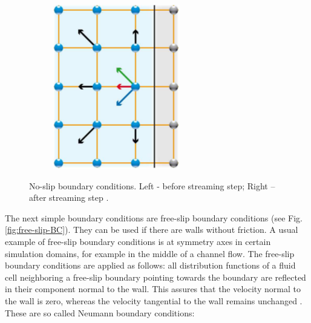 \begin{figure}[H]
\begin{subfigure}[h]{0.3\textwidth}
    \includegraphics[width=\textwidth]{img/fig8-2.png}
  \end{subfigure}
  \caption{No-slip boundary conditions. Left - before streaming step; Right – after streaming step \cite{pflaum}.}\label{fig:no-slip-BC}
\end{figure}

The next simple boundary conditions are free-slip boundary conditions (see Fig. \ref{fig:free-slip-BC}). They can be used if there are walls without friction. A usual example of free-slip boundary conditions is at symmetry axes in certain simulation domains, for example in the middle of a channel flow. The free-slip boundary conditions are applied as follows: all distribution functions of a fluid cell neighboring a free-slip boundary pointing towards the boundary are reflected in their component normal to the wall. This assures that the velocity normal to the wall is zero, whereas the velocity tangential to the wall remains unchanged \cite{pflaum}. These are so called Neumann boundary conditions:


